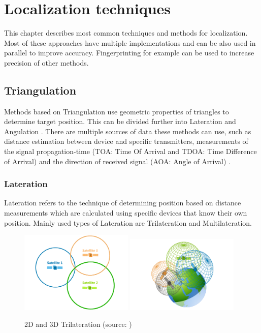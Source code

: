 \chapter{Localization techniques}\label{sec:LocalizationTechniques}
This chapter describes most common techniques and methods for localization. Most of these approaches have multiple implementations and can be also used in parallel to improve accuracy. Fingerprinting for example can be used to increase precision of other methods.

\section{Triangulation}\label{sec:Triangulation}
Methods based on Triangulation use geometric properties of triangles to determine target position. This can be divided further into Lateration and Angulation \cite{RAinWILTaS}. There are multiple sources of data these methods can use, such as distance estimation between device and specific transmitters, measurements of the signal propagation-time (TOA: Time Of Arrival and TDOA: Time Difference of Arrival\cite{LTinWSN}) and the direction of received
signal (AOA: Angle of Arrival\cite{AoALforWSN}) \cite{IILUBLEB}.

\subsection{Lateration}\label{sec:Lateration}
Lateration refers to the technique of determining position based on distance measurements which are calculated using specific devices that know their own position. Mainly used types of Lateration are Trilateration and Multilateration. 

\begin{figure}[h!]
	\begin{centering}
		\includegraphics[width=0.48\textwidth]{img/trilateration_2d}
		\includegraphics[width=0.48\textwidth]{img/trilateration_3d}
		\par\end{centering}
	\caption{2D and 3D Trilateration (source: \cite{TvTHGPSRW})\label{fig:2d_and_3d_trilateration}}
	\label{fig01c02}
\end{figure}

